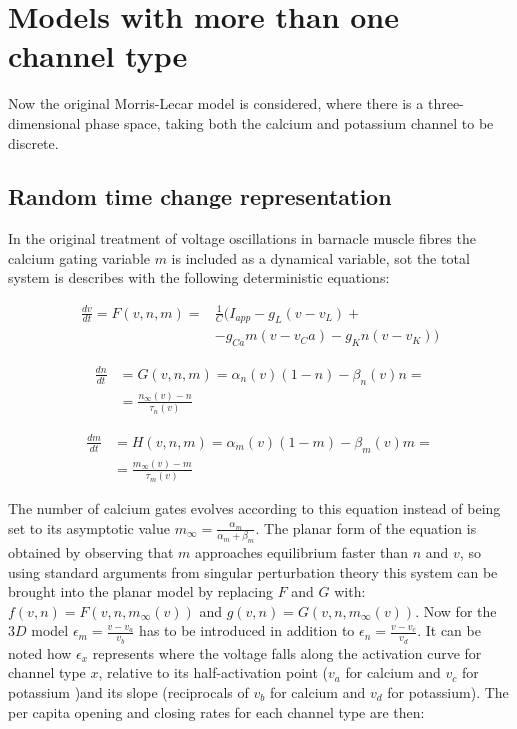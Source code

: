 \section{Models with more than one channel type}
Now the original Morris-Lecar model is considered, where there is a three-dimensional phase space, taking both the calcium and potassium channel to be discrete.

	\subsection{Random time change representation}
	In the original treatment of voltage oscillations  in barnacle muscle fibres the calcium gating variable $m$ is included as a dynamical variable, sot the total system is describes with the following deterministic equations:


	\begin{align*}
		\frac{dv}{dt} = F(v, n, m) =&\frac{1}{C}(I_{app}-g_L(v-v_L)+\\
																&-g_{Ca}m(v-v_Ca)-g_Kn(v-v_K))
	\end{align*}

	\begin{align*}
		\frac{dn}{dt} &= G(v, n, m) = \alpha_n(v)(1-n)-\beta_n(v)n=\\
									&=\frac{n_{\infty}(v)-n}{\tau_n(v)}
	\end{align*}

	\begin{align*}
		\frac{dm}{dt} &= H(v, n, m) = \alpha_m(v)(1-m)-\beta_m(v)m=\\
									&=\frac{m_\infty(v)-m}{\tau_m(v)}
	\end{align*}

	The number of calcium gates evolves according to this equation instead of being set to its asymptotic value $m_\infty = \frac{\alpha_m}{\alpha_m+\beta_m}$.
	The planar form of the equation is obtained by observing that $m$ approaches equilibrium faster than $n$ and $v$, so using standard arguments from singular perturbation theory this system can be brought into the planar model by replacing $F$ and $G$ with: $f(v, n) = F(v, n, m_\infty(v))$ and $g(v, n) = G(v, n, m_\infty(v))$.
	Now for the $3D$ model $\epsilon_m = \frac{v-v_a}{v_b}$ has to be introduced in addition to $\epsilon_n = \frac{v-v_c}{v_d}$.
	It can be noted how $\epsilon_x$ represents where the voltage falls along the activation curve for channel type $x$, relative to its half-activation point ($v_a$ for calcium and $v_c$ for potassium )and its slope (reciprocals of $v_b$ for calcium and $v_d$ for potassium).
	The per capita opening and closing rates for each channel type are then:


